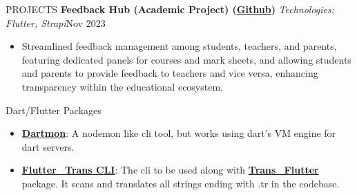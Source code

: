 \documentclass{resume}
\begin{document}
\begin{rSection}{PROJECTS}
    \textbf{Feedback Hub (Academic Project) (\href{https://github.com/ShivanshuKGupta/feedback_hub}{Github})} \textit{Technologies: Flutter, Strapi}\hfill Nov 2023
    \begin{itemize}
        \itemsep -3pt {}
        \item Streamlined feedback management among students, teachers, and parents, featuring dedicated panels for courses and mark sheets, and allowing students and parents to provide feedback to teachers and vice versa, enhancing transparency within the educational ecosystem.
    \end{itemize}

\end{rSection}

\begin{rSection}{Dart/Flutter Packages}
    \begin{itemize}
        \item \textbf{\href{https://pub.dev/packages/dartmon_cli}{Dartmon}}: A nodemon like cli tool, but works using dart's VM engine for dart servers.

        \item \textbf{\href{https://pub.dev/packages/fluttertrans}{Flutter\_Trans CLI}}: The cli to be used along with \textbf{\href{https://pub.dev/packages/trans_flutter}{Trans\_Flutter}} package. It scans and translates all strings ending with .tr in the codebase.

    \end{itemize}
\end{rSection}

\end{document}
